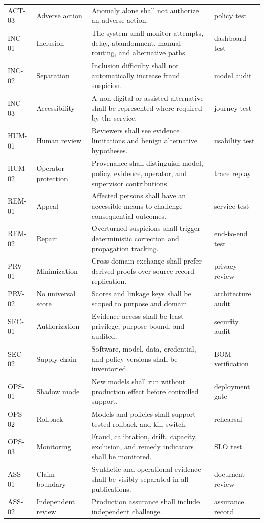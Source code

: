 \begin{longtable}{p{15mm}p{31mm}p{70mm}p{19mm}}
ACT-03 & Adverse action & Anomaly alone shall not authorize an adverse action. & policy test\\
INC-01 & Inclusion & The system shall monitor attempts, delay, abandonment, manual routing, and alternative paths. & dashboard test\\
INC-02 & Separation & Inclusion difficulty shall not automatically increase fraud suspicion. & model audit\\
INC-03 & Accessibility & A non-digital or assisted alternative shall be represented where required by the service. & journey test\\
HUM-01 & Human review & Reviewers shall see evidence limitations and benign alternative hypotheses. & usability test\\
HUM-02 & Operator protection & Provenance shall distinguish model, policy, evidence, operator, and supervisor contributions. & trace replay\\
REM-01 & Appeal & Affected persons shall have an accessible means to challenge consequential outcomes. & service test\\
REM-02 & Repair & Overturned suspicions shall trigger deterministic correction and propagation tracking. & end-to-end test\\
PRV-01 & Minimization & Cross-domain exchange shall prefer derived proofs over source-record replication. & privacy review\\
PRV-02 & No universal score & Scores and linkage keys shall be scoped to purpose and domain. & architecture audit\\
SEC-01 & Authorization & Evidence access shall be least-privilege, purpose-bound, and audited. & security audit\\
SEC-02 & Supply chain & Software, model, data, credential, and policy versions shall be inventoried. & BOM verification\\
OPS-01 & Shadow mode & New models shall run without production effect before controlled support. & deployment gate\\
OPS-02 & Rollback & Models and policies shall support tested rollback and kill switch. & rehearsal\\
OPS-03 & Monitoring & Fraud, calibration, drift, capacity, exclusion, and remedy indicators shall be monitored. & SLO test\\
ASS-01 & Claim boundary & Synthetic and operational evidence shall be visibly separated in all publications. & document review\\
ASS-02 & Independent review & Production assurance shall include independent challenge. & assurance record\\
\bottomrule
\end{longtable}
\normalsize
